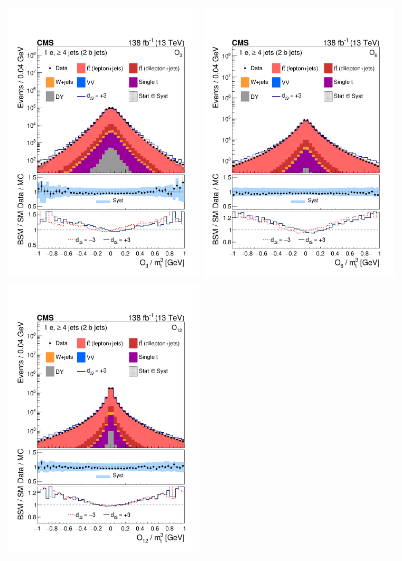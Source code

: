 \begin{figure}[p]
    \centering
    \includegraphics[width=0.45\textwidth]{figure/Figure_001-a.pdf}
    \includegraphics[width=0.45\textwidth]{figure/Figure_001-b.pdf}
    \includegraphics[width=0.45\textwidth]{figure/Figure_001-c.pdf}

\end{figure}
